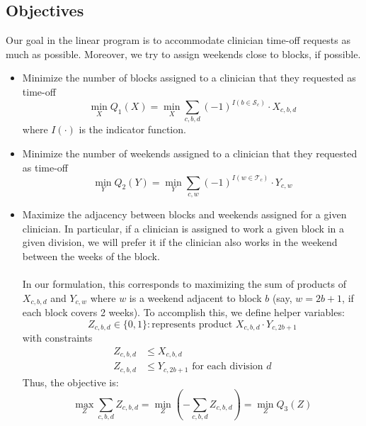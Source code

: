 \documentclass[]{article}
\newcommand{\mc}{\mathcal}
\begin{document}
\subsection{Objectives} \label{objectives}
Our goal in the linear program is to accommodate clinician time-off requests as much as possible. Moreover, we try to assign weekends close to blocks, if possible.
	\begin{itemize}
		\item Minimize the number of blocks assigned to a clinician that they requested as time-off
			\begin{equation}
				\label{eqn_block_obj}
				\min_X Q_1(X) = \min_X \sum_{c, b, d} (-1)^{ I(b \in \mc{S}_c) } \cdot X_{c, b, d}
			\end{equation}
		where $I(\cdot)$ is the indicator function.
		\item Minimize the number of weekends assigned to a clinician that they requested as time-off
			\begin{equation}
				\label{eqn_weekend_obj}
				\min_Y Q_2(Y) = \min_Y \sum_{c, w} (-1)^{ I (w \in \mc{T}_c)} \cdot Y_{c, w}
			\end{equation}
		\item Maximize the adjacency between blocks and weekends assigned for a given clinician. In particular, if a clinician is assigned to work a given block in a given division, we will prefer it if the clinician also works in the weekend between the weeks of the block. \\ \\
		In our formulation, this corresponds to maximizing the sum of products of $X_{c, b, d}$ and $Y_{c, w}$ where $w$ is a weekend adjacent to block $b$ (say, $w = 2b+1$, if each block covers 2 weeks). To accomplish this, we define helper variables:
			\begin{equation}
				Z_{c, b, d} \in \{0, 1\} : \text{represents product $X_{c, b, d}\cdot Y_{c, 2b+1}$}
			\end{equation}
		with constraints
			\begin{align}
				Z_{c, b, d} &\leq X_{c, b, d} \\
				Z_{c, b, d} &\leq Y_{c, 2b+1} \text{ for each division $d$}
			\end{align}
		Thus, the objective is:
			\begin{equation}
				\label{eqn_adjacency_obj}
				\max_Z \sum_{c, b, d} Z_{c, b, d} = \min_Z \left(- \sum_{c, b, d} Z_{c, b, d}\right) = \min_Z Q_3(Z)
			\end{equation}
	\end{itemize}	
\end{document}
